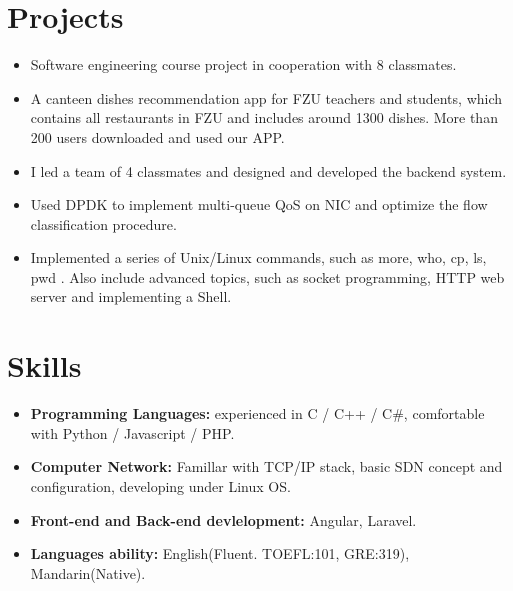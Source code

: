 \documentclass{resume}
\begin{document}
\section{Projects}
\begin{itemize}
  \item Software engineering course project in cooperation with 8 classmates.
  \item A canteen dishes recommendation app for FZU teachers and students, which contains all restaurants in FZU and includes around 1300 dishes. More than 200 users downloaded and used our APP.
  \item I led a team of 4 classmates and designed and developed the backend system.
\end{itemize}

\begin{itemize}
  \item Used DPDK to implement multi-queue QoS on NIC and optimize the flow classification procedure.
\end{itemize}

\begin{itemize}
  \item Implemented a series of Unix/Linux commands, such as more, who, cp, ls, pwd . Also include advanced topics, such as socket programming, HTTP web server and implementing a Shell.
\end{itemize}

\section{Skills}
\begin{itemize}[parsep=0.5ex]
  \item \textbf{Programming Languages:} experienced in C / C++ / C\#, comfortable with Python / Javascript / PHP.
  \item \textbf{Computer Network:} Famillar with TCP/IP stack, basic SDN concept and configuration, developing under Linux OS.
  \item \textbf{Front-end and Back-end devlelopment:} Angular, Laravel.
  \item \textbf{Languages ability:} English(Fluent. TOEFL:101, GRE:319), Mandarin(Native).
\end{itemize}
\end{document}
